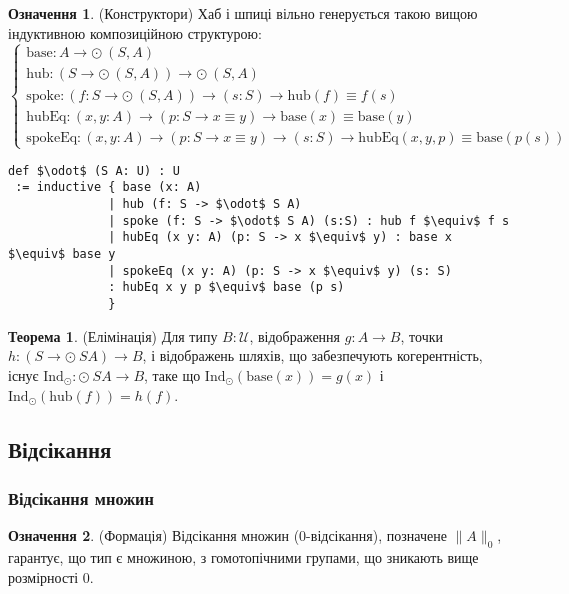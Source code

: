 \documentclass{article}
\theoremstyle{definition}
\newtheorem{theorem}{Теорема}
\newtheorem{definition}{Означення}
\begin{document}
\begin{definition} (Конструктори)
Хаб і шпиці вільно генерується такою вищою індуктивною композиційною структурою:
\[
\begin{cases}
\text{base} : A \to \odot\ (S,A) \\
\text{hub} : (S \to \odot\ (S,A)) \to \odot\ (S,A) \\
\text{spoke} : (f : S \to \odot\ (S,A)) \to (s : S) \to \text{hub}(f) \equiv f(s) \\
\text{hubEq} : (x, y : A) \to (p : S \to x \equiv y) \to \text{base}(x) \equiv \text{base}(y) \\
\text{spokeEq} : (x, y : A) \to (p : S \to x \equiv y) \to (s : S) \to \text{hubEq}(x,y,p) \equiv \text{base}(p(s))
\end{cases}
\]
\begin{lstlisting}[mathescape=true]
def $\odot$ (S A: U) : U
 := inductive { base (x: A)
              | hub (f: S -> $\odot$ S A)
              | spoke (f: S -> $\odot$ S A) (s:S) : hub f $\equiv$ f s
              | hubEq (x y: A) (p: S -> x $\equiv$ y) : base x $\equiv$ base y
              | spokeEq (x y: A) (p: S -> x $\equiv$ y) (s: S)
              : hubEq x y p $\equiv$ base (p s)
              }
\end{lstlisting}
\end{definition}

\begin{theorem} (Елімінація)
Для типу \( B : \mathcal{U} \), відображення \( g : A \to B \),
точки \( h : (S \to \odot\ S A) \to B \), і відображень шляхів,
що забезпечують когерентність, існує
\( \text{Ind}_{\odot} : \odot\ S A \to B \),
таке що \( \text{Ind}_\odot(\text{base}(x)) = g(x) \)
і \( \text{Ind}_\odot(\text{hub}(f)) = h(f) \).
\end{theorem}

\newpage
\subsection{Відсікання}
\subsubsection*{Відсікання множин}
\begin{definition} (Формація)
Відсікання множин (0-відсікання), позначене \( \| A \|_0 \),
гарантує, що тип є множиною, з гомотопічними групами, що зникають вище розмірності 0.
\end{definition}
\end{document}
